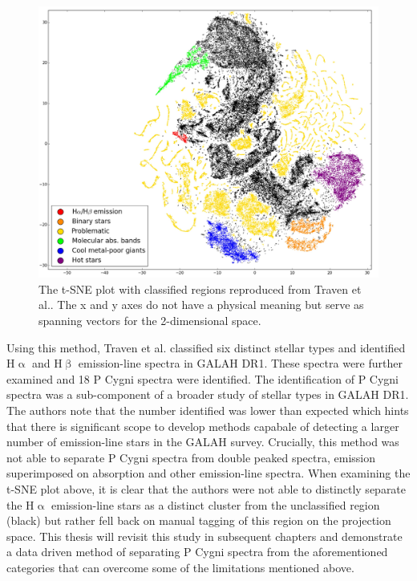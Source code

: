 \begin{figure}[!htb]
\centering
\includegraphics[scale=0.36]{figures/tsne traven.png}
\caption{The t-SNE plot with classified regions reproduced from Traven et al.\cite{traven2017galah}. The x and y axes do not have a physical meaning but serve as spanning vectors for the 2-dimensional space.}
\end{figure}

Using this method, Traven et al. classified six distinct stellar types and identified H$\upalpha$ and H$\upbeta$ emission-line spectra in GALAH DR1. These spectra were further examined and 18 P Cygni spectra were identified. The identification of P Cygni spectra was a sub-component of a broader study of stellar types in GALAH DR1. The authors note that the number identified was lower than expected which hints that there is significant scope to develop methods capabale of detecting a larger number of emission-line stars in the GALAH survey. Crucially, this method was not able to separate P Cygni spectra from double peaked spectra, emission superimposed on absorption and other emission-line spectra. When examining the t-SNE plot above, it is clear that the authors were not able to distinctly separate the H$\upalpha$ emission-line stars as a distinct cluster from the unclassified region (black) but rather fell back on manual tagging of this region on the projection space. This thesis will revisit this study in subsequent chapters and demonstrate a data driven method of separating P Cygni spectra from the aforementioned categories that can overcome some of the limitations mentioned above.

